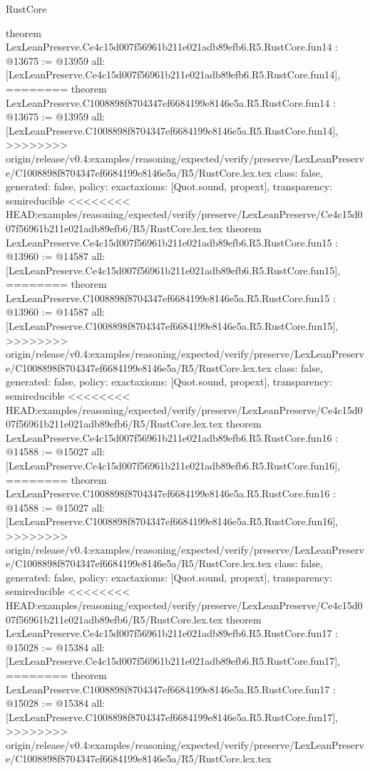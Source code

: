 \begin{lexlean}{RustCore}
\begin{coremodule}
{\begin{coremodule}
{{{{{{{{{{{{{{{{theorem LexLeanPreserve.Ce4c15d007f56961b211e021adb89efb6.R5.RustCore.fun14 : @13675 := @13959 {
  all: [LexLeanPreserve.Ce4c15d007f56961b211e021adb89efb6.R5.RustCore.fun14],
========
theorem LexLeanPreserve.C1008898f8704347ef6684199e8146e5a.R5.RustCore.fun14 : @13675 := @13959 {
  all: [LexLeanPreserve.C1008898f8704347ef6684199e8146e5a.R5.RustCore.fun14],
>>>>>>>> origin/release/v0.4:examples/reasoning/expected/verify/preserve/LexLeanPreserve/C1008898f8704347ef6684199e8146e5a/R5/RustCore.lex.tex
  class: false,
  generated: false,
  policy: exact{axioms: [Quot.sound, propext]},
  transparency: semireducible
}
<<<<<<<< HEAD:examples/reasoning/expected/verify/preserve/LexLeanPreserve/Ce4c15d007f56961b211e021adb89efb6/R5/RustCore.lex.tex
theorem LexLeanPreserve.Ce4c15d007f56961b211e021adb89efb6.R5.RustCore.fun15 : @13960 := @14587 {
  all: [LexLeanPreserve.Ce4c15d007f56961b211e021adb89efb6.R5.RustCore.fun15],
========
theorem LexLeanPreserve.C1008898f8704347ef6684199e8146e5a.R5.RustCore.fun15 : @13960 := @14587 {
  all: [LexLeanPreserve.C1008898f8704347ef6684199e8146e5a.R5.RustCore.fun15],
>>>>>>>> origin/release/v0.4:examples/reasoning/expected/verify/preserve/LexLeanPreserve/C1008898f8704347ef6684199e8146e5a/R5/RustCore.lex.tex
  class: false,
  generated: false,
  policy: exact{axioms: [Quot.sound, propext]},
  transparency: semireducible
}
<<<<<<<< HEAD:examples/reasoning/expected/verify/preserve/LexLeanPreserve/Ce4c15d007f56961b211e021adb89efb6/R5/RustCore.lex.tex
theorem LexLeanPreserve.Ce4c15d007f56961b211e021adb89efb6.R5.RustCore.fun16 : @14588 := @15027 {
  all: [LexLeanPreserve.Ce4c15d007f56961b211e021adb89efb6.R5.RustCore.fun16],
========
theorem LexLeanPreserve.C1008898f8704347ef6684199e8146e5a.R5.RustCore.fun16 : @14588 := @15027 {
  all: [LexLeanPreserve.C1008898f8704347ef6684199e8146e5a.R5.RustCore.fun16],
>>>>>>>> origin/release/v0.4:examples/reasoning/expected/verify/preserve/LexLeanPreserve/C1008898f8704347ef6684199e8146e5a/R5/RustCore.lex.tex
  class: false,
  generated: false,
  policy: exact{axioms: [Quot.sound, propext]},
  transparency: semireducible
}
<<<<<<<< HEAD:examples/reasoning/expected/verify/preserve/LexLeanPreserve/Ce4c15d007f56961b211e021adb89efb6/R5/RustCore.lex.tex
theorem LexLeanPreserve.Ce4c15d007f56961b211e021adb89efb6.R5.RustCore.fun17 : @15028 := @15384 {
  all: [LexLeanPreserve.Ce4c15d007f56961b211e021adb89efb6.R5.RustCore.fun17],
========
theorem LexLeanPreserve.C1008898f8704347ef6684199e8146e5a.R5.RustCore.fun17 : @15028 := @15384 {
  all: [LexLeanPreserve.C1008898f8704347ef6684199e8146e5a.R5.RustCore.fun17],
>>>>>>>> origin/release/v0.4:examples/reasoning/expected/verify/preserve/LexLeanPreserve/C1008898f8704347ef6684199e8146e5a/R5/RustCore.lex.tex
}}}}}}}}}}}}}}}}}}}}}
\end{coremodule}}
\end{coremodule}
\end{lexlean}

